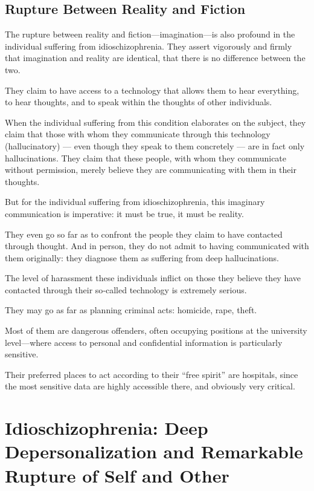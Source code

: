 \documentclass[12pt,oneside]{article}
\begin{document}
\subsection{Rupture Between Reality and Fiction}

The rupture between reality and fiction—imagination—is also profound in the individual suffering from idioschizophrenia. They assert vigorously and firmly that imagination and reality are identical, that there is no difference between the two.

They claim to have access to a technology that allows them to hear everything, to hear thoughts, and to speak within the thoughts of other individuals.

When the individual suffering from this condition elaborates on the subject, they claim that those with whom they communicate through this technology (hallucinatory) — even though they speak to them concretely — are in fact only hallucinations. They claim that these people, with whom they communicate without permission, merely believe they are communicating with them in their thoughts.

But for the individual suffering from idioschizophrenia, this imaginary communication is imperative: it must be true, it must be reality.

They even go so far as to confront the people they claim to have contacted through thought. And in person, they do not admit to having communicated with them originally: they diagnose them as suffering from deep hallucinations.

The level of harassment these individuals inflict on those they believe they have contacted through their so‑called technology is extremely serious.

They may go as far as planning criminal acts: homicide, rape, theft.

Most of them are dangerous offenders, often occupying positions at the university level—where access to personal and confidential information is particularly sensitive.

Their preferred places to act according to their “free spirit” are hospitals, since the most sensitive data are highly accessible there, and obviously very critical.

\section{Idioschizophrenia: Deep Depersonalization and Remarkable Rupture of Self and Other}
\end{document}
